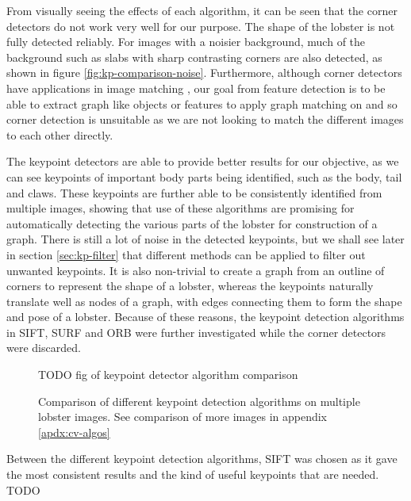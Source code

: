 \noindent
From visually seeing the effects of each algorithm, it can be seen that the corner detectors do not work very well for our purpose. The shape of the lobster is not fully detected reliably. For images with a noisier background, much of the background such as slabs with sharp contrasting corners are also detected, as shown in figure \ref{fig:kp-comparison-noise}. Furthermore, although corner detectors have applications in image matching \cite{corner-detection}, our goal from feature detection is to be able to extract graph like objects or features to apply graph matching on and so corner detection is unsuitable as we are not looking to match the different images to each other directly. 

The keypoint detectors are able to provide better results for our objective, as we can see keypoints of important body parts being identified, such as the body, tail and claws. These keypoints are further able to be consistently identified from multiple images, showing that use of these algorithms are promising for automatically detecting the various parts of the lobster for construction of a graph. There is still a lot of noise in the detected keypoints, but we shall see later in section \ref{sec:kp-filter} that different methods can be applied to filter out unwanted keypoints. It is also non-trivial to create a graph from an outline of corners to represent the shape of a lobster, whereas the keypoints naturally translate well as nodes of a graph, with edges connecting them to form the shape and pose of a lobster. Because of these reasons, the keypoint detection algorithms in SIFT, SURF and ORB were further investigated while the corner detectors were discarded.

\begin{figure}[H]
\centering
TODO  fig of keypoint detector algorithm comparison
\caption{Comparison of different keypoint detection algorithms on multiple lobster images. See comparison of more images in appendix \ref{apdx:cv-algos}}
\end{figure}
\noindent

Between the different keypoint detection algorithms, SIFT was chosen as it gave the most consistent results and the kind of useful keypoints that are needed. TODO


